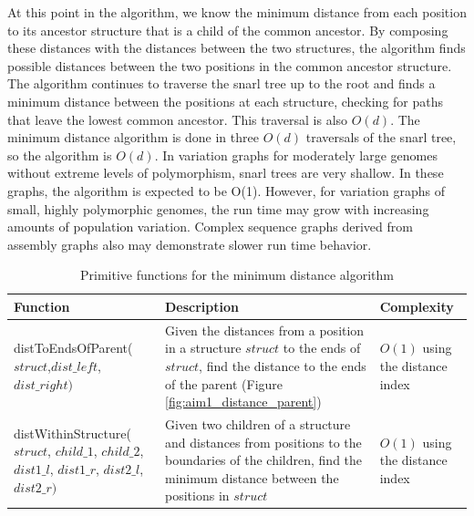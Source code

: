 \documentclass[11pt]{ucscthesis}
\begin{document}
At this point in the algorithm, we know the minimum distance from each position to its ancestor structure that is a child of the common ancestor.
By composing these distances with the distances between the two structures, the algorithm finds possible distances between the two positions in the common ancestor structure.
The algorithm continues to traverse the snarl tree up to the root and finds a minimum distance between the positions at each structure, checking for paths that leave the lowest common ancestor.
This traversal is also $O(d)$.
The minimum distance algorithm is done in three $O(d)$ traversals of the snarl tree, so the algorithm is $O(d)$.
In variation graphs for moderately large genomes without extreme levels of polymorphism, snarl trees are very shallow.
In these graphs, the algorithm is expected to be O(1). However, for variation graphs of small, highly polymorphic genomes, the run time may grow with increasing amounts of population variation.
Complex sequence graphs derived from assembly graphs also may demonstrate slower run time behavior.


\begin{table}[H]
    \centering
    \caption[Primitive functions for the minimum distance algorithm]{Primitive functions for the minimum distance algorithm}
    \label{tab:aim1_min_functions}
    \begin{tabularx}{\columnwidth}{|p{120pt}|X|p{70pt}|}
        \hline
         Function & Description & Complexity  \\
         \hline
         distToEndsOfParent( $struct$,$dist\_left$, $dist\_right)$ & Given the distances from a position in a structure $struct$ to the ends of $struct$, find the distance to the ends of the parent (Figure \ref{fig:aim1_distance_parent}) &$O(1)$ using the distance index\\
         distWithinStructure( $struct$, $child\_1$, $child\_2$, $dist1\_l$, $dist1\_r$, $dist2\_l$, $dist2\_r)$  & Given two children of a structure and distances from positions to the boundaries of the children, find the minimum distance between the positions in $struct$ & $O(1)$ using the distance index\\

         \hline
    \end{tabularx}
\end{table}
\end{document}

